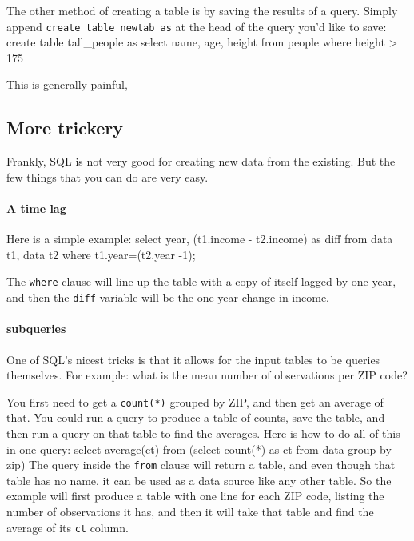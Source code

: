 The other method of creating a table is by saving the results of a
query. Simply append {\tt create table newtab as} at the head of the
query you'd like to save: 
create table tall_people as
select name, age, height 
from people
where height > 175



This is generally painful, 

\subsection{More trickery} Frankly, SQL is not very good for
creating new data from the existing. But the few things that you can do
are very easy.

\paragraph{A time lag} Here is a simple example:
select year, (t1.income - t2.income) as diff
   from data t1, data t2
   where t1.year=(t2.year -1);

The {\tt where} clause will line up the table with a copy of itself
lagged by one year, and then the {\tt diff} variable will be the
one-year change in income.


\paragraph{subqueries}

One of SQL's nicest tricks is that it allows for the input tables to be
queries themselves. For example: what is the mean number of observations per
ZIP code?

You first need to get a {\tt count(*)} grouped by ZIP, and then get an
average of that. You could run a query to produce a table of counts,
save the table, and then run a query on that table to find the averages.
Here is how to do all of this in one query: 
select average(ct) 
   from (select count(*) as ct
            from data
            group by zip)
The query inside the {\tt from} clause will return a table, and even
though that table has no name, it can be used as a data source like any other
table. So the example will first produce a table with one line for each
ZIP code, listing the number of observations it has, and then it will
take that table and find the average of its {\tt ct} column.

